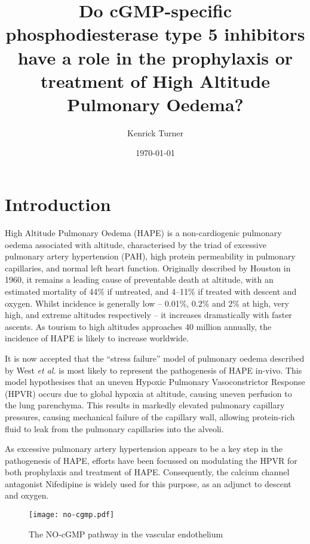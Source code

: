 \documentclass[10pt,a4paper]{article}
\title{Do cGMP-specific phosphodiesterase type 5 inhibitors have a role in the prophylaxis or treatment of High Altitude Pulmonary Oedema?}
\author{Kenrick Turner}
\date{\today}
\begin{document}
\maketitle


\section*{Introduction}

High Altitude Pulmonary Oedema (HAPE) is a non-cardiogenic pulmonary oedema associated with altitude, characterised by the triad of excessive pulmonary artery hypertension (PAH), high protein permeability in pulmonary capillaries, and normal left heart function.\cite{Fred:1962hy,Roy:1969tt,Schoene:1988tz} Originally described by Houston in 1960, it remains a leading cause of preventable death at altitude, with an estimated mortality of 44\% if untreated, and 4--11\% if treated with descent and oxygen.\cite{HOUSTON:1960gz,Lobenhoffer:1982eg,MENON:1965gk} Whilst incidence is generally low -- 0.01\%, 0.2\% and 2\% at high, very high, and extreme altitudes respectively -- it increases dramatically with faster ascents.\cite{Bartsch:2002cg} As tourism to high altitudes approaches 40 million annually, the incidence of HAPE is likely to increase worldwide.\cite{West:ug}

It is now accepted that the ``stress failure'' model of pulmonary oedema described by West \emph{et al.} is most likely to represent the pathogenesis of HAPE in-vivo.\cite{Maggiorini:2001vq} This model hypothesises that an uneven Hypoxic Pulmonary Vasoconstrictor Response (HPVR) occurs due to global hypoxia at altitude, causing uneven perfusion to the lung parenchyma. This results in markedly elevated pulmonary capillary pressures, causing mechanical failure of the capillary wall, allowing protein-rich fluid to leak from the pulmonary capillaries into the alveoli.\cite{West:1991vc,West:1995tg}

As excessive pulmonary artery hypertension appears to be a key step in the pathogenesis of HAPE,\cite{Maggiorini:2001vq,Swenson:2002ub} efforts have been focussed on modulating the HPVR for both prophylaxis and treatment of HAPE. Consequently, the calcium channel antagonist Nifedipine is widely used for this purpose, as an adjunct to descent and oxygen.\cite{Luks:2010ht}

\begin{figure}[!hb]
\centering
\texttt{[image: no-cgmp.pdf]}
\caption{The NO-cGMP pathway in the vascular endothelium\cite{Archer:2009cx}}
\label{fig:no-cgmp_pathway}
\end{figure}
\end{document}
